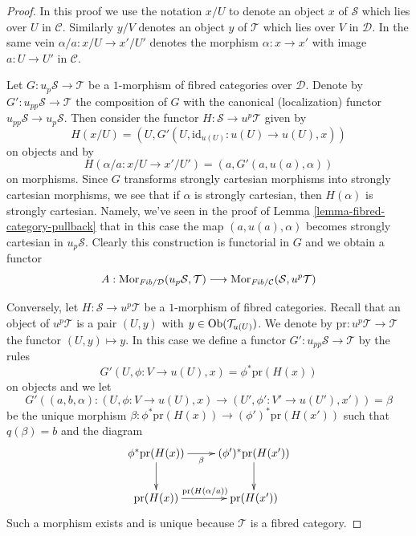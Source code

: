 \begin{proof}
In this proof we use the notation $x/U$ to denote an object
$x$ of $\mathcal{S}$ which lies over $U$ in $\mathcal{C}$.
Similarly $y/V$ denotes an object $y$ of $\mathcal{T}$
which lies over $V$ in $\mathcal{D}$. In the same vein
$\alpha/a : x/U \to x'/U'$ denotes the morphism
$\alpha : x \to x'$ with image $a : U \to U'$ in $\mathcal{C}$.

\medskip\noindent
Let $G : u_p\mathcal{S} \to \mathcal{T}$ be a $1$-morphism of fibred
categories over $\mathcal{D}$. Denote by $G' : u_{pp}\mathcal{S} \to \mathcal{T}$
the composition of $G$ with the canonical (localization) functor
$u_{pp}\mathcal{S} \to u_p\mathcal{S}$. Then consider the functor
$H : \mathcal{S} \to u^p\mathcal{T}$ given by
$$
H(x/U) = (U, G'(U, \text{id}_{u(U)} : u(U) \to u(U), x))
$$
on objects and by
$$
H(\alpha/a : x/U \to x'/U') = (a, G'(a, u(a), \alpha))
$$
on morphisms. Since $G$ transforms strongly cartesian morphisms
into strongly cartesian morphisms, we see that if $\alpha$ is strongly
cartesian, then $H(\alpha)$ is strongly cartesian.
Namely, we've seen in the proof of
Lemma \ref{lemma-fibred-category-pullback}
that in this case the map $(a, u(a), \alpha)$ becomes
strongly cartesian in $u_p\mathcal{S}$. Clearly this construction is
functorial in $G$ and we obtain a functor
$$
A :
\mathop{\mathrm{Mor}}\nolimits_{\textit{Fib}/\mathcal{D}}(u_p\mathcal{S}, \mathcal{T})
\longrightarrow
\mathop{\mathrm{Mor}}\nolimits_{\textit{Fib}/\mathcal{C}}(\mathcal{S}, u^p\mathcal{T})
$$

\medskip\noindent
Conversely, let $H : \mathcal{S} \to u^p\mathcal{T}$ be a $1$-morphism
of fibred categories. Recall that an object of $u^p\mathcal{T}$ is
a pair $(U, y)$ with $y \in \mathop{\mathrm{Ob}}\nolimits(\mathcal{T}_{u(U)})$. We denote by
$\text{pr} : u^p\mathcal{T} \to \mathcal{T}$ the functor $(U, y) \mapsto y$.
In this case we define a functor
$G' : u_{pp}\mathcal{S} \to \mathcal{T}$ by the rules
$$
G'(U, \phi : V \to u(U), x) = \phi^*\text{pr}(H(x))
$$
on objects and we let
$$
G'((a, b, \alpha) : (U, \phi : V \to u(U), x)
\to (U', \phi' : V' \to u(U'), x'))
=
\beta
$$
be the unique morphism
$\beta : \phi^*\text{pr}(H(x)) \to (\phi')^*\text{pr}(H(x'))$
such that $q(\beta) = b$ and the diagram
$$
\xymatrix{
\phi^*\text{pr}(H(x)) \ar[d] \ar[r]_-{\beta} &
(\phi')^*\text{pr}(H(x')) \ar[d] \\
\text{pr}(H(x)) \ar[r]^{\text{pr}(H(\alpha/a))} & \text{pr}(H(x'))
}
$$
Such a morphism exists and is unique because $\mathcal{T}$ is a fibred
category.


\end{proof}
